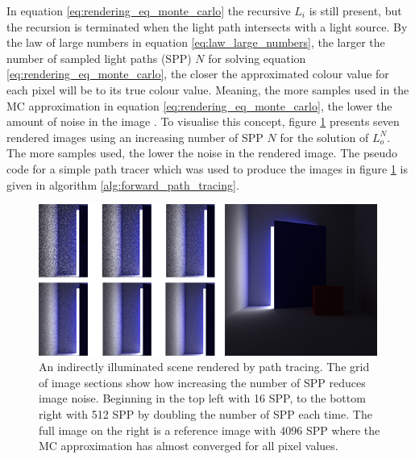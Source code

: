 \documentclass[../dissertation.tex]{subfiles}
\begin{document}
In equation \ref{eq:rendering_eq_monte_carlo} the recursive $L_i$ is still present, but the recursion is terminated when the light path intersects with a light source. By the law of large numbers in equation \ref{eq:law_large_numbers}, the larger the number of sampled light paths (SPP) $N$ for solving equation \ref{eq:rendering_eq_monte_carlo}, the closer the approximated colour value for each pixel will be to its true colour value. Meaning, the more samples used in the MC approximation in equation \ref{eq:rendering_eq_monte_carlo}, the lower the amount of noise in the image \cite{christensen2016path}. To visualise this concept, figure \ref{fig:reduce_noise_spp_example} presents seven rendered images using an increasing number of SPP $N$ for the solution of $L_o^N$. The more samples used, the lower the noise in the rendered image. The pseudo code for a simple path tracer which was used to produce the images in figure \ref{fig:reduce_noise_spp_example} is given in algorithm \ref{alg:forward_path_tracing}.

\begin{figure}[h]
\begin{center}
\includegraphics[width=0.99\textwidth]{images/renders/noise_reduction_default/increasing_samples.png}    
\end{center}
\caption{An indirectly illuminated scene rendered by path tracing. The grid of image sections show how increasing the number of SPP reduces image noise. Beginning in the top left with 16 SPP, to the bottom right with 512 SPP by doubling the number of SPP each time. The full image on the right is a reference image with 4096 SPP where the MC approximation has almost converged for all pixel values.}
\label{fig:reduce_noise_spp_example}
\end{figure}
\end{document}
